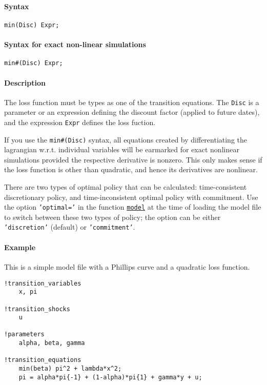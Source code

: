 


	\paragraph{Syntax}\label{syntax}

\begin{verbatim}
min(Disc) Expr;
\end{verbatim}

\paragraph{Syntax for exact non-linear
simulations}\label{syntax-for-exact-non-linear-simulations}

\begin{verbatim}
min#(Disc) Expr;
\end{verbatim}

\paragraph{Description}\label{description}

The loss function must be types as one of the transition equations. The
\texttt{Disc} is a parameter or an expression defining the discount
factor (applied to future dates), and the expression \texttt{Expr}
defines the loss fuction.

If you use the \texttt{min\#(Disc)} syntax, all equations created by
differentiating the lagrangian w.r.t. individual variables will be
earmarked for exact nonlinear simulations provided the respective
derivative is nonzero. This only makes sense if the loss function is
other than quadratic, and hence its derivatives are nonlinear.

There are two types of optimal policy that can be calculated:
time-consistent discretionary policy, and time-inconsistent optimal
policy with commitment. Use the option \texttt{'optimal='} in the
function \href{model/model}{\texttt{model}} at the time of loading the
model file to switch between these two types of policy; the option can
be either \texttt{'discretion'} (default) or \texttt{'commitment'}.

\paragraph{Example}\label{example}

This is a simple model file with a Phillips curve and a quadratic loss
function.

\begin{verbatim}
!transition_variables
    x, pi

!transition_shocks
    u

!parameters
    alpha, beta, gamma

!transition_equations
    min(beta) pi^2 + lambda*x^2;
    pi = alpha*pi{-1} + (1-alpha)*pi{1} + gamma*y + u;
\end{verbatim}


